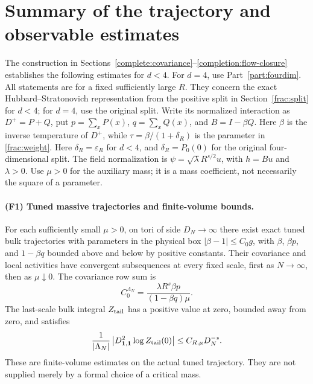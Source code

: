 \documentclass[11pt]{article}
\begin{document}
\section{Summary of the trajectory and observable estimates}\label{frac:inputs}
The construction in Sections~\ref{complete:covariance}--\ref{completion:flow-closure}
establishes the following estimates for \(d<4\). For \(d=4\), use
Part~\ref{part:fourdim}. All statements are
for a fixed sufficiently large \(R\). They concern the exact
Hubbard--Stratonovich representation from the positive split in
Section~\ref{frac:split} for \(d<4\); for \(d=4\), use the original split. Write its normalized interaction as
\(D^+=P+Q\), put \(p=\sum_xP(x)\), \(q=\sum_xQ(x)\), and
\(B=I-\beta Q\). Here \(\beta\) is the inverse temperature of
\(D^+\), while \(\tau=\beta/(1+\delta_R)\) is the parameter in
\eqref{frac:weight}. Here \(\delta_R=\varepsilon_R\) for \(d<4\),
and \(\delta_R=P_0(0)\) for the original four-dimensional split.
The field normalization is
\(\psi=\sqrt\lambda R^{s/2}u\), with \(h=Bu\) and \(\lambda>0\).
Use \(\mu>0\) for the auxiliary mass; it is a mass coefficient,
not necessarily the square of a parameter.

\paragraph{(F1) Tuned massive trajectories and finite-volume bounds.}
For each sufficiently small \(\mu>0\), on tori of side \(D_N\to\infty\)
there exist exact tuned bulk trajectories with parameters in the physical box \( |\beta-1|\le C_0g\), with \(\beta\), \(\beta p\), and \(1-\beta q\) bounded
above and below by positive constants. Their covariance and local activities have convergent
subsequences at every fixed scale, first as \(N\to\infty\), then as
\(\mu\downarrow0\). The covariance row sum is
\[
 C_0^{\Lambda_N}=\frac{\lambda R^s\beta p}{(1-\beta q)\mu}.
\]
The last-scale bulk integral \(Z_{\rm tail}\) has a positive value at
zero, bounded away from zero, and satisfies
\begin{equation}\label{frac:tail-derivative-input}
 \frac1{|\Lambda_N|}
  \left|D^2_{\boldsymbol1,\boldsymbol1}\log Z_{\rm tail}(0)\right|
     \le C_{R,\mu}D_N^{-s}.
\end{equation}
These are finite-volume estimates on the actual tuned trajectory.
They are not supplied merely by a formal choice of a critical mass.
\end{document}
